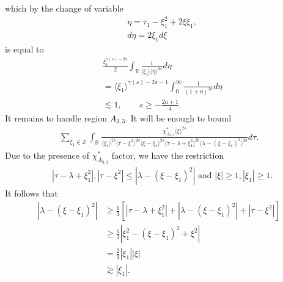 \documentclass[12pt,reqno]{amsart}
\numberwithin{equation}{section}  %
\numberwithin{figure}{section}
\newcommand{\rr}{\mathbb{R}}
\newcommand{\zz}{\mathbb{Z}}
\theoremstyle{plain}
\theoremstyle{definition}
\theoremstyle{remark}
\begin{document}
which by the change of variable
%
%
\begin{equation*}
\begin{split}
  & \eta = \tau_{1} - \xi_{1}^{2} + 2 \xi \xi_{1},
  \\
  & d \eta = 2 \xi_{1} d \xi
\end{split}
\end{equation*}
%
%
is equal to
%
%
\begin{equation*}
\begin{split}
  & \frac{\xi_{1}^{\gamma(s) -2a}}{2}  \int_{\rr} 
  \frac{1}{| \xi_{1} |\langle \eta \rangle ^{2a} }d \eta
  \\
  & = \langle \xi_{1} \rangle ^{\gamma(s) -2a -1} \int_{0}^{\infty} \frac{1}{(1 + \eta
  )^{2a}}d \eta
  \\
  & \lesssim 1, \qquad s \ge -\frac{2a+1}{4}.
\end{split}
\end{equation*}
It remains to handle region $A_{3,3}$. It will be enough to bound
%
%
\begin{equation}
  \label{region-A-2-3-star-split}
\begin{split}
   \sum_{\xi_{1} \in \zz} \int_{\rr} \frac{\chi^{*}_{A_{3,3}}
    \langle \xi \rangle ^{2s}
    }{ \langle \xi_{1} \rangle^{2s} \langle  \tau  - \xi^{2}
    \rangle ^{2a}  \langle
\xi-\xi_{1} \rangle ^{2s}  \langle  \tau - \lambda+\xi_{1}^{2}
\rangle^{2b} \langle   \lambda  -(\xi - \xi_{1})^{2}
\rangle^{2b} } d \tau.
\end{split}
\end{equation}
%
Due to the presence of $\chi^{*}_{A_{3,3}}$ factor, we have the restriction
%
%
\begin{equation*}
\begin{split}
& |\tau - \lambda +\xi_{1}^2|, | \tau - \xi^{2} | \le |  \lambda -
(\xi - \xi_{1})^{2} | \text{ and }  |\xi| \ge 1, |\xi_1| \ge 1.
\end{split}
\end{equation*}
%
It follows that
\begin{equation}
  \label{smoothing-2-3-case-6}
\begin{split}
  | \lambda - (\xi - \xi_{1})^{2} |
  & \ge \frac{1}{3}\left[ | \tau - \lambda + \xi_{1}^{2} | + | \lambda - (\xi - \xi_{1})^{2}
  | + | \tau - \xi^{2} | \right]
  \\
  & \ge \frac{1}{3} |  \xi_{1}^{2} - (\xi - \xi_{1})^{2} + \xi^{2} |
  \\
  & = \frac{2}{3} | \xi_{1} | | \xi |
  \\
  & \gtrsim | \xi_{1} |.
\end{split}
\end{equation}
\end{document}
